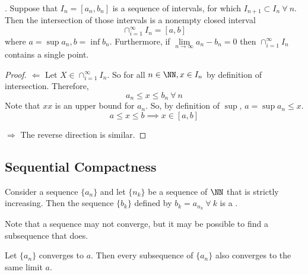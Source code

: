 \documentclass[12pt]{scrartcl}
\begin{document}
\begin{theorem}
  . Suppose that $I_n = [a_n, b_n]$ is a sequence of intervals, 
  for which $I_{n+1} \subset I_n \ \forall \ n$. Then the intersection of those intervals 
  is a nonempty closed interval 
  \[\cap_{i=1}^\infty I_n = [a, b]\] 
  where $a = \sup a_n, b = \inf b_n$. 
  Furthermore, if $\underset{n\to\infty}{\lim}a_n - b_n = 0$ then 
  $\cap_{i=1}^\infty I_n$ contains a single point. 
  \begin{proof}
    
    \hfill

    $\Longleftarrow$ Let $X \in \cap_{i=1}^\infty I_n$. So for all $n \in \NN, x \in I_n$
    by definition of intersection. Therefore, 
    \[a_n \leq x \leq b_n \ \forall \ n\]
    Note that $xx$ is an upper bound for $a_n$. So, by definition of $\sup$, $a = \sup a_n \leq x$. 
    \[a \leq x \leq b \implies x \in [a, b]\]

    \hfill

    $\Longrightarrow$ The reverse direction is similar. 
  \end{proof}
\end{theorem}

\subsection{Sequential Compactness}

\begin{definition}
  Consider a sequence $\{a_n\}$ and let $\{n_k\}$ be a sequence of $\NN$ that is strictly increasing.
  Then the sequence $\{b_k\}$ defined by $b_k = a_{n_k} \ \forall \ k$
  is a .
\end{definition}

\begin{note}
  Note that a sequence may not converge, but it may be possible to find a subsequence that does.
\end{note}

\begin{theorem}
  Let $\{a_n\}$ converges to $a$. Then every subsequence of $\{a_n\}$ also converges to the same limit $a$. 
\end{theorem}
\end{document}
